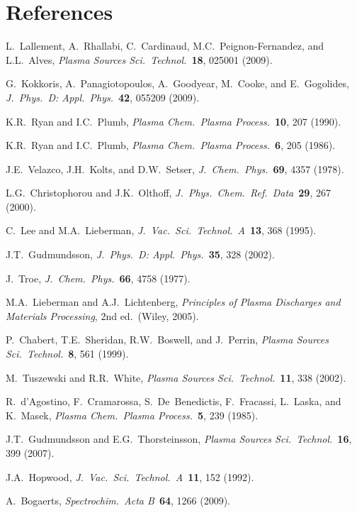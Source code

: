\documentclass[11pt,a4paper]{article}
\begin{document}
\section*{References}

\begin{enumerate}[label={[\arabic*]}]
\item L.\ Lallement, A.\ Rhallabi, C.\ Cardinaud, M.C.\ Peignon-Fernandez, and L.L.\ Alves, \textit{Plasma Sources Sci.\ Technol.}\ \textbf{18}, 025001 (2009).
\item G.\ Kokkoris, A.\ Panagiotopoulos, A.\ Goodyear, M.\ Cooke, and E.\ Gogolides, \textit{J.\ Phys.\ D: Appl.\ Phys.}\ \textbf{42}, 055209 (2009).
\item K.R.\ Ryan and I.C.\ Plumb, \textit{Plasma Chem.\ Plasma Process.}\ \textbf{10}, 207 (1990).
\item K.R.\ Ryan and I.C.\ Plumb, \textit{Plasma Chem.\ Plasma Process.}\ \textbf{6}, 205 (1986).
\item J.E.\ Velazco, J.H.\ Kolts, and D.W.\ Setser, \textit{J.\ Chem.\ Phys.}\ \textbf{69}, 4357 (1978).
\item L.G.\ Christophorou and J.K.\ Olthoff, \textit{J.\ Phys.\ Chem.\ Ref.\ Data}\ \textbf{29}, 267 (2000).
\item C.\ Lee and M.A.\ Lieberman, \textit{J.\ Vac.\ Sci.\ Technol.\ A}\ \textbf{13}, 368 (1995).
\item J.T.\ Gudmundsson, \textit{J.\ Phys.\ D: Appl.\ Phys.}\ \textbf{35}, 328 (2002).
\item J.\ Troe, \textit{J.\ Chem.\ Phys.}\ \textbf{66}, 4758 (1977).
\item M.A.\ Lieberman and A.J.\ Lichtenberg, \textit{Principles of Plasma Discharges and Materials Processing}, 2nd ed.\ (Wiley, 2005).
\item P.\ Chabert, T.E.\ Sheridan, R.W.\ Boswell, and J.\ Perrin, \textit{Plasma Sources Sci.\ Technol.}\ \textbf{8}, 561 (1999).
\item M.\ Tuszewski and R.R.\ White, \textit{Plasma Sources Sci.\ Technol.}\ \textbf{11}, 338 (2002).
\item R.\ d'Agostino, F.\ Cramarossa, S.\ De~Benedictis, F.\ Fracassi, L.\ Laska, and K.\ Masek, \textit{Plasma Chem.\ Plasma Process.}\ \textbf{5}, 239 (1985).
\item J.T.\ Gudmundsson and E.G.\ Thorsteinsson, \textit{Plasma Sources Sci.\ Technol.}\ \textbf{16}, 399 (2007).
\item J.A.\ Hopwood, \textit{J.\ Vac.\ Sci.\ Technol.\ A}\ \textbf{11}, 152 (1992).
\item A.\ Bogaerts, \textit{Spectrochim.\ Acta B}\ \textbf{64}, 1266 (2009).
\end{enumerate}
\end{document}
